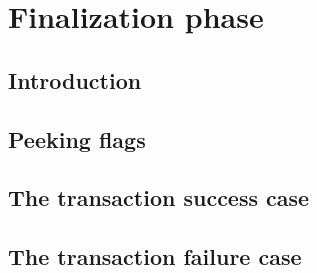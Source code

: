 
\section{Finalization phase \lispDone{}}                \label{hub: finalization phase} 
\subsection{Introduction}                               \label{hub: finalization phase: intro}     
\subsection{Peeking flags                \lispDone{}}   \label{hub: finalization phase: peeking}   
\subsection{The transaction success case \lispDone{}}   \label{hub: finalization phase: success}   
\subsection{The transaction failure case \lispDone{}}   \label{hub: finalization phase: failure}   
